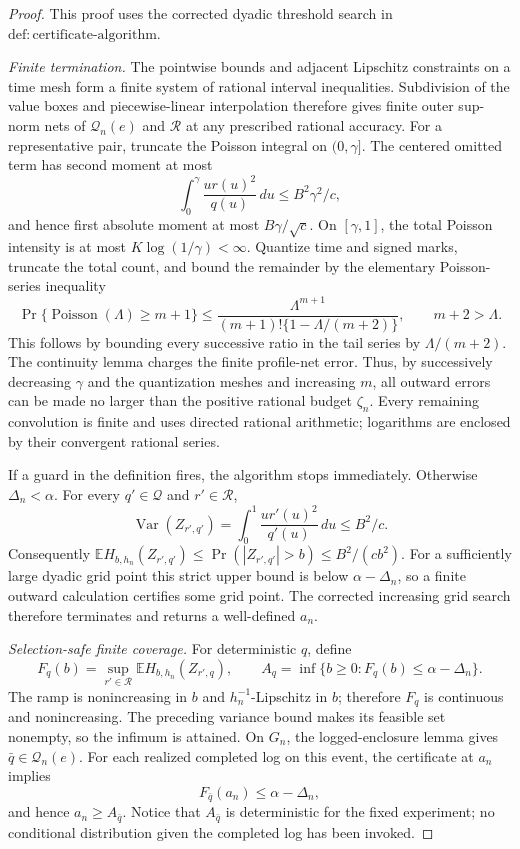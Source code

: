 \documentclass{article}
\begin{document}
\begin{proof}
This proof uses the corrected dyadic threshold search in
\(\mathrm{def:certificate\mbox{-}algorithm}\).

\emph{Finite termination.}
The pointwise bounds and adjacent Lipschitz constraints on a time mesh form a finite system of rational interval inequalities.  Subdivision of the value boxes and piecewise-linear interpolation therefore gives finite outer sup-norm nets of
\(\mathcal Q_n(e)\) and \(\mathcal R\) at any prescribed rational accuracy.
For a representative pair, truncate the Poisson integral on \((0,\gamma]\).
The centered omitted term has second moment at most
\[
 \int_0^\gamma\frac{u r(u)^2}{q(u)}\,du
 \leq B^2\gamma^2/c,
\]
and hence first absolute moment at most \(B\gamma/\sqrt c\).
On \([\gamma,1]\), the total Poisson intensity is at most
\(K\log(1/\gamma)<\infty\).  Quantize time and signed marks, truncate the total count, and bound the remainder by the elementary Poisson-series inequality
\[
 \Pr\{\operatorname{Poisson}(\Lambda)\geq m+1\}
 \leq\frac{\Lambda^{m+1}}
 {(m+1)!\{1-\Lambda/(m+2)\}},
 \qquad m+2>\Lambda.
\]
This follows by bounding every successive ratio in the tail series by
\(\Lambda/(m+2)\).  The continuity lemma charges the finite profile-net error.
Thus, by successively decreasing \(\gamma\) and the quantization meshes and increasing \(m\), all outward errors can be made no larger than the positive rational budget \(\zeta_n\).  Every remaining convolution is finite and uses directed rational arithmetic; logarithms are enclosed by their convergent rational series.

If a guard in the definition fires, the algorithm stops immediately.  Otherwise
\(\Delta_n<\alpha\).  For every \(q'\in\mathcal Q\) and \(r'\in\mathcal R\),
\[
 \operatorname{Var}(Z_{r',q'})
 =\int_0^1\frac{u r'(u)^2}{q'(u)}\,du
 \leq B^2/c.
\]
Consequently
\(\mathbb EH_{b,h_n}(Z_{r',q'})
\leq\Pr(|Z_{r',q'}|>b)\leq B^2/(cb^2)\).
For a sufficiently large dyadic grid point this strict upper bound is below
\(\alpha-\Delta_n\), so a finite outward calculation certifies some grid point.
The corrected increasing grid search therefore terminates and returns a well-defined \(a_n\).

\emph{Selection-safe finite coverage.}
For deterministic \(q\), define
\[
 F_q(b)=\sup_{r'\in\mathcal R}
          \mathbb EH_{b,h_n}(Z_{r',q}),\qquad
 A_q=\inf\{b\geq0:F_q(b)\leq\alpha-\Delta_n\}.
\]
The ramp is nonincreasing in \(b\) and \(h_n^{-1}\)-Lipschitz in \(b\);
therefore \(F_q\) is continuous and nonincreasing.  The preceding variance bound makes its feasible set nonempty, so the infimum is attained.
On \(G_n\), the logged-enclosure lemma gives
\(\bar q\in\mathcal Q_n(e)\).  For each realized completed log on this event, the certificate at \(a_n\) implies
\[
 F_{\bar q}(a_n)\leq\alpha-\Delta_n,
\]
and hence \(a_n\geq A_{\bar q}\).  Notice that \(A_{\bar q}\) is deterministic for the fixed experiment; no conditional distribution given the completed log has been invoked.


\end{proof}
\end{document}
